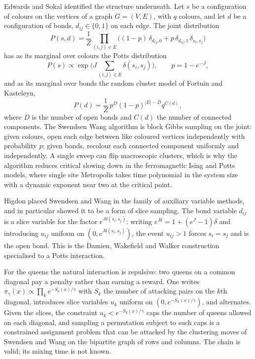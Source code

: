\documentclass[11pt,twoside,openany]{book}
\theoremstyle{plain}
\theoremstyle{definition}
\theoremstyle{remark}
\begin{document}
Edwards and Sokal identified the structure underneath. Let $s$ be a configuration of colours on the vertices of a graph $G = (V, E)$, with $q$ colours, and let $d$ be a configuration of bonds, $d_{ij} \in \{0, 1\}$ on each edge. The joint distribution
\[
P(s, d) = \frac{1}{Z} \prod_{(i,j) \in E} \Big( (1 - p) \, \delta_{d_{ij}, 0} + p \, \delta_{d_{ij}, 1} \, \delta_{s_i, s_j} \Big)
\]
has as its marginal over colours the Potts distribution
\[
P(s) \propto \exp\Big( J \sum_{(i,j) \in E} \delta(s_i, s_j) \Big), \qquad p = 1 - e^{-J},
\]
and as its marginal over bonds the random cluster model of Fortuin and Kasteleyn,
\[
P(d) = \frac{1}{Z} \, p^{D} (1 - p)^{|E| - D} q^{C(d)} ,
\]
where $D$ is the number of open bonds and $C(d)$ the number of connected components. The Swendsen Wang algorithm is block Gibbs sampling on the joint: given colours, open each edge between like coloured vertices independently with probability $p$; given bonds, recolour each connected component uniformly and independently. A single sweep can flip macroscopic clusters, which is why the algorithm reduces critical slowing down in the ferromagnetic Ising and Potts models, where single site Metropolis takes time polynomial in the system size with a dynamic exponent near two at the critical point.

Higdon placed Swendsen and Wang in the family of auxiliary variable methods, and in particular showed it to be a form of slice sampling. The bond variable $d_{ij}$ is a slice variable for the factor $e^{J \delta(s_i, s_j)}$: writing $e^{J \delta} = 1 + (e^{J} - 1) \delta$ and introducing $u_{ij}$ uniform on $(0, e^{J \delta(s_i, s_j)})$, the event $u_{ij} > 1$ forces $s_i = s_j$ and is the open bond. This is the Damien, Wakefield and Walker construction specialised to a Potts interaction.

For the queens the natural interaction is repulsive: two queens on a common diagonal pay a penalty rather than earning a reward. One writes $\pi_\gamma(x) \propto \prod_k e^{-S_k(x)/\gamma}$ with $S_k$ the number of attacking pairs on the $k$th diagonal, introduces slice variables $u_k$ uniform on $(0, e^{-S_k(x)/\gamma})$, and alternates. Given the slices, the constraint $u_k < e^{-S_k(x)/\gamma}$ caps the number of queens allowed on each diagonal, and sampling a permutation subject to such caps is a constrained assignment problem that can be attacked by the clustering moves of Swendsen and Wang on the bipartite graph of rows and columns. The chain is valid; its mixing time is not known.
\end{document}
